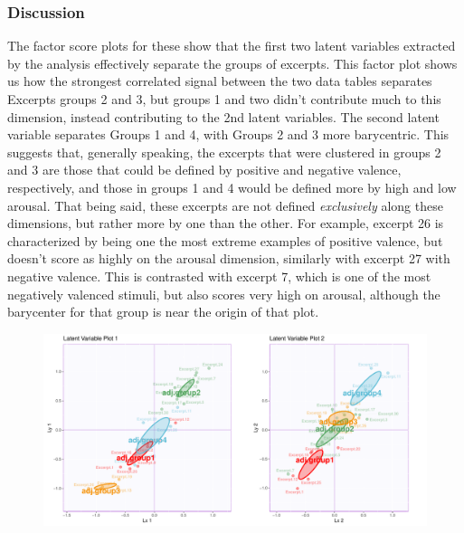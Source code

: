 \documentclass[
  english,
  man,floatsintext]{apa6}
\begin{document}
\hypertarget{discussion-2}{%
\subsubsection{Discussion}\label{discussion-2}}

The factor score plots for these show that the first two latent variables extracted by the analysis effectively separate the groups of excerpts. This factor plot shows us how the strongest correlated signal between the two data tables separates Excerpts groups 2 and 3, but groups 1 and two didn't contribute much to this dimension, instead contributing to the 2nd latent variables. The second latent variable separates Groups 1 and 4, with Groups 2 and 3 more barycentric. This suggests that, generally speaking, the excerpts that were clustered in groups 2 and 3 are those that could be defined by positive and negative valence, respectively, and those in groups 1 and 4 would be defined more by high and low arousal. That being said, these excerpts are not defined \emph{exclusively} along these dimensions, but rather more by one than the other. For example, excerpt 26 is characterized by being one the most extreme examples of positive valence, but doesn't score as highly on the arousal dimension, similarly with excerpt 27 with negative valence. This is contrasted with excerpt 7, which is one of the most negatively valenced stimuli, but also scores very high on arousal, although the barycenter for that group is near the origin of that plot.

\begin{figure}

{\centering \includegraphics{Music-Descriptor-Space_files/figure-latex/factorplotsPLSC-1} 

}

\caption{ }\label{fig:factorplotsPLSC}
\end{figure}
\end{document}
